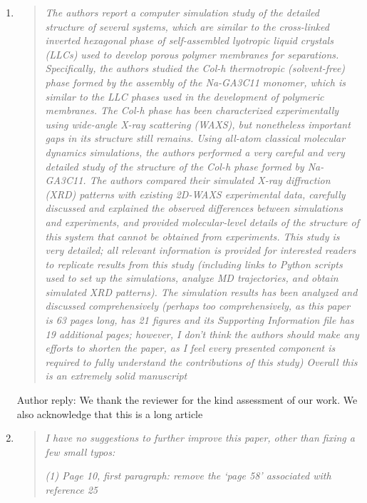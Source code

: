 \documentclass{article}
\begin{document}
\begin{enumerate}
	
	\item \begin{quote} \textit{The authors report a computer simulation study of the detailed structure
	of several systems, which are similar to the cross-linked inverted hexagonal phase of self-assembled
	lyotropic liquid crystals (LLCs) used to develop porous polymer membranes for separations. Specifically,
	the authors studied the Col-h thermotropic (solvent-free) phase formed by the assembly of the Na-GA3C11
	monomer, which is similar to the LLC phases used in the development of polymeric membranes. The Col-h 
	phase has been characterized experimentally using wide-angle X-ray scattering (WAXS), but nonetheless 
	important gaps in its structure still remains. Using all-atom classical molecular dynamics simulations,
	the authors performed a very careful and very detailed study of the structure of the Col-h phase formed
	by Na-GA3C11. The authors compared their simulated X-ray diffraction (XRD) patterns with existing 2D-WAXS
	experimental data, carefully discussed and explained the observed differences between simulations and 
	experiments, and provided molecular-level details of the structure of this system that cannot be obtained
	from experiments. This study is very detailed; all relevant information is provided for interested readers
	to replicate results from this study (including links to Python scripts used to set up the simulations, 
	analyze MD trajectories, and obtain simulated XRD patterns). The simulation results has been analyzed and
	discussed comprehensively (perhaps too comprehensively, as this paper is 63 pages long, has 21 figures and
	its Supporting Information file has 19 additional pages; however, I don’t think the authors should make any
	efforts to shorten the paper, as I feel every presented component is required to fully understand the 
	contributions of this study) Overall this is an extremely solid manuscript}\end{quote}
	
	Author reply: We thank the reviewer for the kind assessment of our work. We also acknowledge that this is a long article
	
	\item \begin{quote}
	
	\textit{I have no suggestions to further improve this paper, other than fixing a few small typos:}
	
    \textit{(1) Page 10, first paragraph: remove the ‘page 58’ associated with reference 25}


\end{quote}
\end{enumerate}
\end{document}
